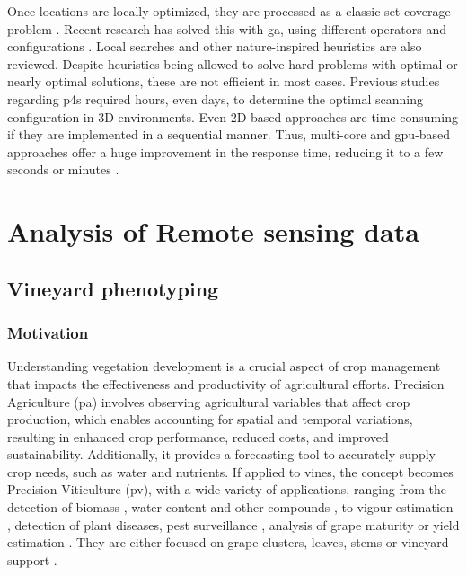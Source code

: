 Once locations are locally optimized, they are processed as a classic set-coverage problem \cite{soudarissanane_optimizing_2012}. Recent research has solved this with \acrshort{ga}, using different operators and configurations \cite{wang_solving_2018, roostapour_pareto_2022, mohamadi_efficient_2021}. Local searches \cite{li_probability_2021} and other nature-inspired heuristics \cite{islambouli_optimized_2019} are also reviewed. Despite heuristics being allowed to solve hard problems with optimal or nearly optimal solutions, these are not efficient in most cases. Previous studies regarding \acrshort{p4s} required hours, even days, to determine the optimal scanning configuration in 3D environments. Even 2D-based approaches are time-consuming \cite{giorgini_sensor-based_2019} if they are implemented in a sequential manner. Thus, multi-core and \acrshort{gpu}-based approaches offer a huge improvement in the response time, reducing it to a few seconds or minutes \cite{giorgini_sensor-based_2019, wang_solving_2018, roberge_parallel_2021}. 

\section{Analysis of Remote sensing data}

\subsection{Vineyard phenotyping}

\subsubsection{Motivation}

Understanding vegetation development is a crucial aspect of crop management that impacts the effectiveness and productivity of agricultural efforts. Precision Agriculture (\acrshort{pa}) involves observing agricultural variables that affect crop production, which enables accounting for spatial and temporal variations, resulting in enhanced crop performance, reduced costs, and improved sustainability. Additionally, it provides a forecasting tool to accurately supply crop needs, such as water and nutrients. If applied to vines, the concept becomes Precision Viticulture (\acrshort{pv}), with a wide variety of applications, ranging from the detection of biomass \cite{di_gennaro_evaluation_2020}, water content \cite{santesteban_high-resolution_2017, gutierrez_assessing_2021} and other compounds \cite{peng_prediction_2022}, to vigour estimation \cite{bramley_12_2010, campos_development_2019}, detection of plant diseases, pest surveillance \cite{mendes_vineinspector_2022}, analysis of grape maturity \cite{soubry_monitoring_2017} or yield estimation \cite{hassanzadeh_broadacre_2021}. They are either focused on grape clusters, leaves, stems or vineyard support \cite{singh_bibliometric_2022}. 

